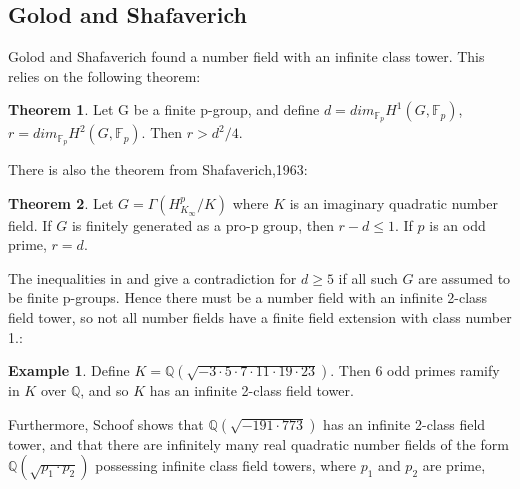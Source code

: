 \documentclass[12pt]{extarticle}
\newcommand{\Q}{\mathbb{Q}}
\newcommand{\<}{\langle}
\renewcommand{\>}{\rangle}
\theoremstyle{definition}
\newtheorem{theorem}{Theorem}
\newtheorem{example}{Example}
\begin{document}
\subsection{Golod and Shafaverich}
Golod and Shafaverich \cite{GOLO} found a number field with an infinite class tower. This relies on the following theorem:

\begin{theorem}
\label{thm:gs1}
    Let G be a finite p-group, and define $d=dim_{\mathbb{F}_{p}}H^1(G,\mathbb{F}_p)$, $r=dim_{\mathbb{F}_{p}}H^2(G,\mathbb{F}_p)$. 
    Then $r>d^2/4$.
\end{theorem}
There is also the theorem from Shafaverich,1963:

\begin{theorem}
\label{thm:gs2}
    Let $G = \Gamma(H_{K_{\infty}}^{p}/K)$ where $K$ is an imaginary quadratic number field. If $G$ is finitely generated as a pro-p group, then
$r-d\leq 1 $. If $p$ is an odd prime, $r=d$.
\end{theorem}
The inequalities in  and  give a contradiction for $d \geq 5$ if all such $G$ are assumed to be finite p-groups. Hence there must be a number field with an infinite 2-class field tower, so not all number fields have a finite field extension with class number 1.:
\begin{example}
    Define $K=\Q(\sqrt{-3 \cdot 5\cdot7\cdot11\cdot19\cdot23})$. Then 6 odd primes ramify in $K$ over $\Q$, and so $K$ has an infinite 2-class field tower. 
\end{example}
Furthermore, Schoof \cite{SCHO} shows that $\Q\left(\sqrt{-191\cdot773}\right)$ has an infinite 2-class field tower, and that there are infinitely many real quadratic number fields of the form $\Q(\sqrt{p_1 \cdot p_2})$ possessing infinite class field towers, where $p_1$ and $p_2$ are prime, 
\end{document}

